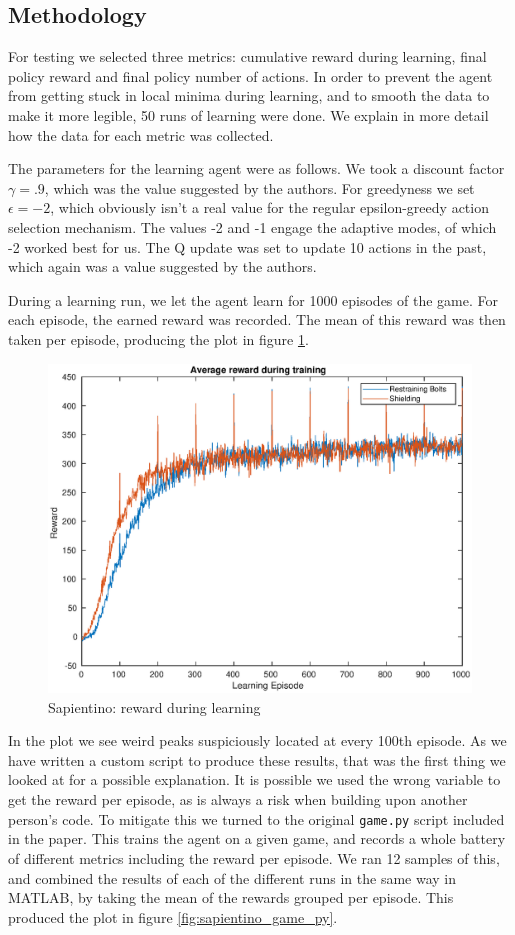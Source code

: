 \documentclass[letterpaper]{article}
\begin{document}
\subsection{Methodology}
For testing we selected three metrics: cumulative reward during learning, final policy reward and final policy number of actions. In order to prevent the agent from getting stuck in local minima during learning, and to smooth the data to make it more legible, 50 runs of learning were done. We explain in more detail how the data for each metric was collected. 
\par The parameters for the learning agent were as follows. We took a discount factor $\gamma = .9$, which was the value suggested by the authors. For greedyness we set $\epsilon = -2$, which obviously isn't a real value for the regular epsilon-greedy action selection mechanism. The values -2 and -1 engage the adaptive modes, of which -2 worked best for us. The Q update was set to update 10 actions in the past, which again was a value suggested by the authors. 
\par During a learning run, we let the agent learn for 1000 episodes of the game. For each episode, the earned reward was recorded. The mean of this reward was then taken per episode, producing the plot in figure \ref{fig:learning_reward}. 
\begin{figure}[ht]
    \centering
    \includegraphics[width=.5\textwidth]{figs/sapientino_learning_reward.eps}
    \caption{Sapientino: reward during learning}
    \label{fig:learning_reward}
\end{figure}
\par In the plot we see weird peaks suspiciously located at every 100th episode. As we have written a custom script to produce these results, that was the first thing we looked at for a possible explanation. It is possible we used the wrong variable to get the reward per episode, as is always a risk when building upon another person's code. To mitigate this we turned to the original \texttt{game.py} script included in the paper. This trains the agent on a given game, and records a whole battery of different metrics including the reward per episode. We ran 12 samples of this, and combined the results of each of the different runs in the same way in MATLAB, by taking the mean of the rewards grouped per episode. This produced the plot in figure \ref{fig:sapientino_game_py}. 
\end{document}
